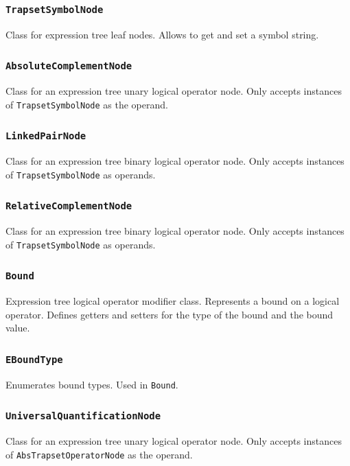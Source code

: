 \documentclass[12pt,oneside,a4paper,notitlepage]{report}
\begin{document}
	\subsubsection{\texttt{TrapsetSymbolNode}}
	\par Class for expression tree leaf nodes. Allows to get and set a symbol string.

	\subsubsection{\texttt{AbsoluteComplementNode}}
	\par Class for an expression tree unary logical operator node. Only accepts instances of \texttt{TrapsetSymbolNode} as the operand.

	\subsubsection{\texttt{LinkedPairNode}}
	\par Class for an expression tree binary logical operator node. Only accepts instances of \texttt{TrapsetSymbolNode} as operands.

	\subsubsection{\texttt{RelativeComplementNode}}
	\par Class for an expression tree binary logical operator node. Only accepts instances of \texttt{TrapsetSymbolNode} as operands.

	\subsubsection{\texttt{Bound}}
	\par Expression tree logical operator modifier class. Represents a bound on a logical operator. Defines getters and setters for the type of the bound and the bound value.

	\subsubsection{\texttt{EBoundType}}
	\par Enumerates bound types. Used in \texttt{Bound}.

	\subsubsection{\texttt{UniversalQuantificationNode}}
	\par Class for an expression tree unary logical operator node. Only accepts instances of \texttt{AbsTrapsetOperatorNode} as the operand.
\end{document}
